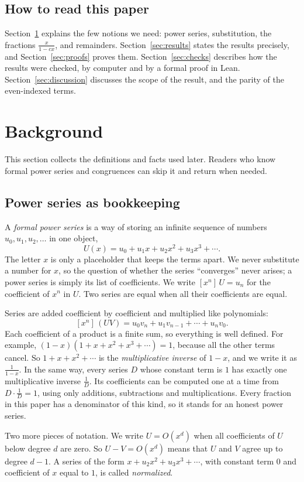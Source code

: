 \documentclass[11pt,a4paper]{article}
\theoremstyle{definition}
\theoremstyle{remark}
\newcommand{\coeff}[2]{[x^{#1}]\,#2}
\begin{document}
\subsection{How to read this paper}
Section~\ref{sec:background} explains the few notions we need: power series, substitution, the fractions
$\frac{x}{1-cx}$, and remainders. Section~\ref{sec:results} states the results precisely, and Section~\ref{sec:proofs}
proves them. Section~\ref{sec:checks} describes how the results were checked, by computer and by a formal proof in
Lean. Section~\ref{sec:discussion} discusses the scope of the result, and the parity of the even-indexed terms.
\section{Background}\label{sec:background}
This section collects the definitions and facts used later. Readers who know formal power series and congruences can skip it and return when needed.
\subsection{Power series as bookkeeping}
A \emph{formal power series} is a way of storing an infinite sequence of numbers $u_0,u_1,u_2,\dots$ in one object,
\[
U(x)=u_0+u_1x+u_2x^2+u_3x^3+\cdots .
\]
The letter $x$ is only a placeholder that keeps the terms apart. We never substitute a number for $x$, so the question
of whether the series ``converges'' never arises; a power series is simply its list of coefficients. We write
$\coeff{n}{U}=u_n$ for the coefficient of $x^n$ in $U$. Two series are equal when all their coefficients are equal.

Series are added coefficient by coefficient and multiplied like polynomials:
\[
\coeff{n}{(UV)}=u_0v_n+u_1v_{n-1}+\cdots+u_nv_0 .
\]
Each coefficient of a product is a finite sum, so everything is well defined. For example,
$(1-x)(1+x+x^2+x^3+\cdots)=1$, because all the other terms cancel. So $1+x+x^2+\cdots$ is the
\emph{multiplicative inverse} of $1-x$, and we write it as $\frac{1}{1-x}$. In the same way, every series $D$ whose
constant term is $1$ has exactly one multiplicative inverse $\frac1D$. Its coefficients can be computed one at a time
from $D\cdot\frac1D=1$, using only additions, subtractions and multiplications. Every fraction in this paper has a
denominator of this kind, so it stands for an honest power series.

Two more pieces of notation. We write $U=O(x^d)$ when all coefficients of $U$ below degree $d$ are zero. So
$U-V=O(x^d)$ means that $U$ and $V$ agree up to degree $d-1$. A series of the form $x+u_2x^2+u_3x^3+\cdots$, with
constant term $0$ and coefficient of $x$ equal to $1$, is called \emph{normalized}.
\end{document}
